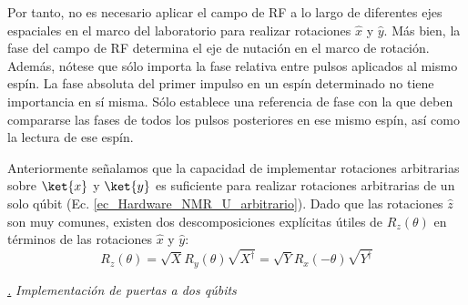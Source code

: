 \documentclass[a4paper,11pt]{book} %
\numberwithin{equation}{chapter}
\def\subsubiContadorIt{\par\addtocounter{subsubsection}{1}\underline{\it\thesubsubsection.}\hskip0.5cm \setcounter{subsubsubsectionIt}{0}}
\newcommand{\SubsubiIt}[1]{
		\subsubiContadorIt \textit{#1}
	}
\newcounter{subsubsubsectionIt}[subsubsection]
\begin{document}
Por tanto, no es necesario aplicar el campo de RF a lo largo de diferentes ejes espaciales en el marco del laboratorio para realizar rotaciones $\hat{x}$ y $\hat{y}$. Más bien, la fase del campo de RF determina el eje de nutación en el marco de rotación. Además, nótese que sólo importa la fase relativa entre pulsos aplicados al mismo espín. La fase absoluta del primer impulso en un espín determinado no tiene importancia en sí misma. Sólo establece una referencia de fase con la que deben compararse las fases de todos los pulsos posteriores en ese mismo espín, así como la lectura de ese espín.

Anteriormente señalamos que la capacidad de implementar rotaciones arbitrarias sobre $\ket{x}$ y $\ket{y}$ es suficiente para realizar rotaciones arbitrarias de un solo qúbit (Ec. \ref{ec_Hardware_NMR_U_arbitrario}). Dado que las rotaciones $\hat{z}$ son muy comunes, existen dos descomposiciones explícitas útiles de $R_z(\theta)$ en términos de las rotaciones $\hat{x}$ y $\hat{y}$:
	\begin{equation}
	R_z (\theta) = \sqrt{X} R_y (\theta) \sqrt{X^\dagger} = \sqrt{Y} R_x(-\theta) \sqrt{Y^\dagger}
	\end{equation}


			\SubsubiIt{Implementación de puertas a dos qúbits} 
\end{document}
